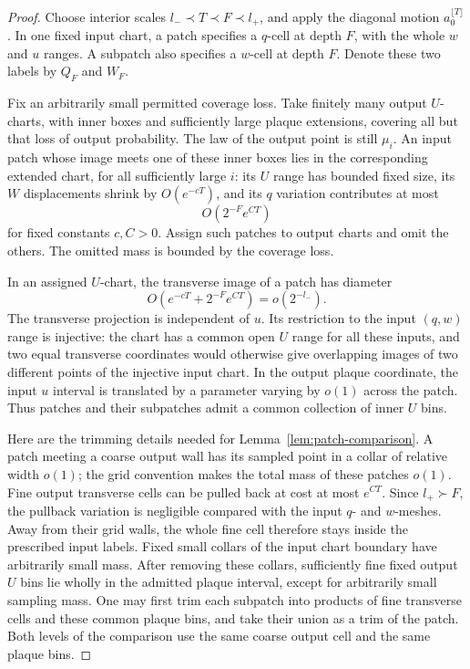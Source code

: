 \begin{proof}
Choose interior scales \(l_-\prec T\prec F\prec l_+\), and apply
the diagonal motion \(a_0^{\lfloor T\rfloor}\).
In one fixed input chart, a patch specifies a \(q\)-cell at depth
\(F\), with the whole \(w\) and \(u\) ranges.  A subpatch also
specifies a \(w\)-cell at depth \(F\).  Denote these two labels by
\(Q_F\) and \(W_F\).

Fix an arbitrarily small permitted coverage loss.  Take finitely
many output \(U\)-charts, with inner boxes and sufficiently large
plaque extensions, covering all but that loss of output probability.
The law of the output point is still \(\mu_i\).  An input patch whose
image meets one of these inner boxes lies in the corresponding
extended chart, for all sufficiently large \(i\): its \(U\) range
has bounded fixed size, its \(W\) displacements shrink by
\(O(e^{-cT})\), and its \(q\) variation contributes at most
\[
                       O(2^{-F}e^{CT})
\]
for fixed constants \(c,C>0\).  Assign such patches to output charts
and omit the others.  The omitted mass is bounded by the coverage
loss.

In an assigned \(U\)-chart, the transverse image of a patch has
diameter
\[
                       O(e^{-cT}+2^{-F}e^{CT})
                       =o(2^{-l_-}).
\]
The transverse projection is independent of \(u\).  Its restriction
to the input \((q,w)\) range is injective: the chart has a common
open \(U\) range for all these inputs, and two equal transverse
coordinates would otherwise give overlapping images of two
different points of the injective input chart.  In the output
plaque coordinate, the input \(u\) interval is translated by a
parameter varying by \(o(1)\) across the patch.  Thus patches and
their subpatches admit a common collection of inner \(U\) bins.

Here are the trimming details needed for
Lemma~\ref{lem:patch-comparison}.  A patch meeting a coarse output
wall has its sampled point in a collar of relative width \(o(1)\);
the grid convention makes the total mass of these patches \(o(1)\).
Fine output transverse cells can be pulled back at cost at most
\(e^{CT}\).  Since \(l_+\succ F\), the pullback variation is
negligible compared with the input \(q\)- and \(w\)-meshes.
Away from their grid walls, the whole fine cell therefore stays
inside the prescribed input labels.  Fixed small collars of the
input chart boundary have arbitrarily small mass.  After removing
these collars, sufficiently fine fixed output \(U\) bins lie wholly
in the admitted plaque interval, except for arbitrarily small
sampling mass.  One may first trim each subpatch into products of
fine transverse cells and these common plaque bins, and take their
union as a trim of the patch.  Both levels of the comparison use the
same coarse output cell and the same plaque bins.


\end{proof}
